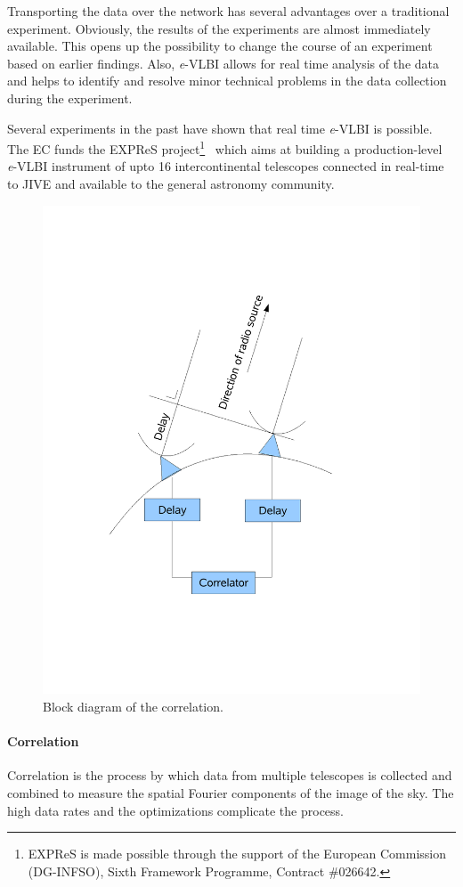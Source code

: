 Transporting the data over the network has several advantages over a
traditional experiment. Obviously, the results of the experiments are
almost immediately available. This opens up the possibility to change
the course of an experiment based on earlier findings. Also, {\it
  e}-VLBI allows for real time analysis of the data and helps to
identify and resolve minor technical problems in the data collection
during the experiment.

Several experiments in the past have shown that real time {\it e}-VLBI
is possible. The EC funds the EXPReS project\footnote{EXPReS is made
  possible through the support of the European Commission (DG-INFSO),
  Sixth Framework Programme, Contract \#026642.}~\cite{EXPReS} which
aims at building a production-level {\it e}-VLBI instrument of upto 16
intercontinental telescopes connected in real-time to JIVE and
available to the general astronomy community.

\begin{figure}
  \centering
  \includegraphics[width=.75\textwidth]
  {img/VLBI}
  \caption{Block diagram of the correlation.}
  \label{fig:correlation_diagram}
\end{figure}
\paragraph{Correlation}
Correlation is the process by which data from multiple telescopes is
collected and combined to measure the spatial Fourier components of
the image of the sky. The high data rates and the optimizations
complicate the process.

